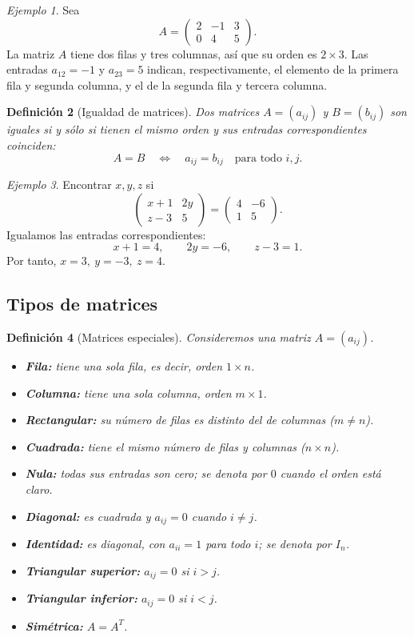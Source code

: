 \documentclass[12pt]{article}
\newtheorem{definicion}{Definición}[section]
\theoremstyle{remark}
\newtheorem{ejemplo}[definicion]{Ejemplo}
\begin{document}
\begin{ejemplo}
Sea
\[
A=\begin{pmatrix}2&-1&3\\0&4&5\end{pmatrix}.
\]
La matriz $A$ tiene dos filas y tres columnas, así que su orden es $2\times3$. Las entradas $a_{12}=-1$ y $a_{23}=5$ indican, respectivamente, el elemento de la primera fila y segunda columna, y el de la segunda fila y tercera columna.
\end{ejemplo}

\begin{definicion}[Igualdad de matrices]
Dos matrices $A=(a_{ij})$ y $B=(b_{ij})$ son iguales si y sólo si tienen el mismo orden y sus entradas correspondientes coinciden:
\[
A=B\quad\Longleftrightarrow\quad a_{ij}=b_{ij}\quad\text{para todo }i,j.
\]
\end{definicion}

\begin{ejemplo}
Encontrar $x,y,z$ si
\[
\begin{pmatrix}x+1&2y\\z-3&5\end{pmatrix}=
\begin{pmatrix}4&-6\\1&5\end{pmatrix}.
\]
Igualamos las entradas correspondientes:
\[
x+1=4,\qquad 2y=-6,\qquad z-3=1.
\]
Por tanto, $\boxed{x=3,\ y=-3,\ z=4}$.
\end{ejemplo}

\subsection{Tipos de matrices}
\begin{definicion}[Matrices especiales]
Consideremos una matriz $A=(a_{ij})$.
\begin{itemize}
\item \textbf{Fila:} tiene una sola fila, es decir, orden $1\times n$.
\item \textbf{Columna:} tiene una sola columna, orden $m\times1$.
\item \textbf{Rectangular:} su número de filas es distinto del de columnas ($m\ne n$).
\item \textbf{Cuadrada:} tiene el mismo número de filas y columnas ($n\times n$).
\item \textbf{Nula:} todas sus entradas son cero; se denota por $0$ cuando el orden está claro.
\item \textbf{Diagonal:} es cuadrada y $a_{ij}=0$ cuando $i\ne j$.
\item \textbf{Identidad:} es diagonal, con $a_{ii}=1$ para todo $i$; se denota por $I_n$.
\item \textbf{Triangular superior:} $a_{ij}=0$ si $i>j$.
\item \textbf{Triangular inferior:} $a_{ij}=0$ si $i<j$.
\item \textbf{Simétrica:} $A=A^T$.
\end{itemize}
\end{definicion}
\end{document}
